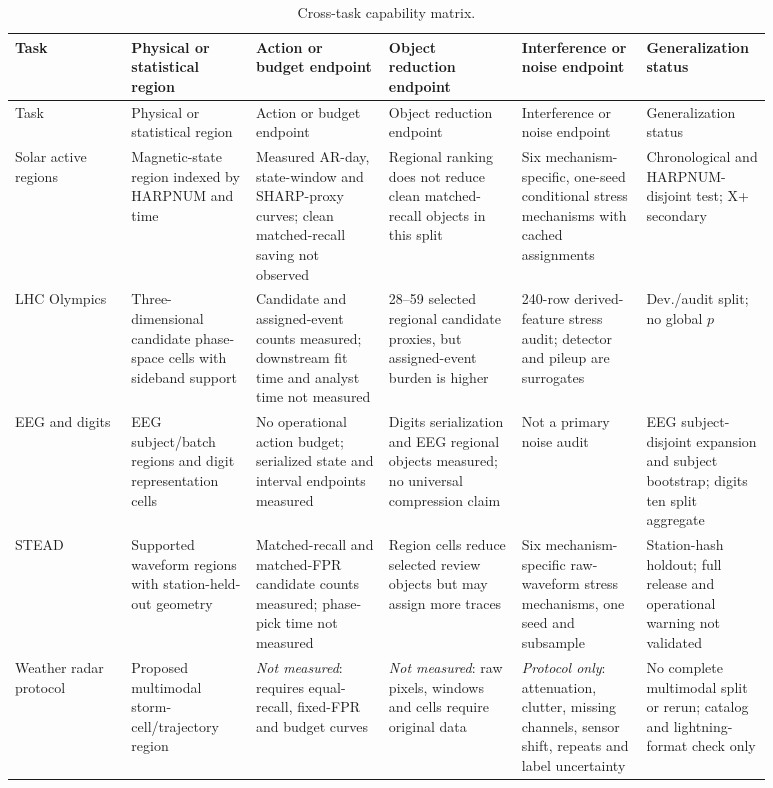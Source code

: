 \documentclass[11pt,a4paper]{article}
\numberwithin{equation}{section}
\theoremstyle{definition}\newtheorem{definition}[theorem]{Definition}
\theoremstyle{remark}\newtheorem{remark}[theorem]{Remark}
\begin{document}
{\scriptsize\setlength{\tabcolsep}{2pt}\begin{longtable}{L{0.14\linewidth}L{0.15\linewidth}L{0.16\linewidth}L{0.16\linewidth}L{0.15\linewidth}L{0.12\linewidth}}
\caption{Cross-task capability matrix.}\label{tab:capabilitymatrix}\\
\toprule
Task & Physical or statistical region & Action or budget endpoint & Object reduction endpoint & Interference or noise endpoint & Generalization status\\
\midrule
\endfirsthead
\toprule
Task & Physical or statistical region & Action or budget endpoint & Object reduction endpoint & Interference or noise endpoint & Generalization status\\
\midrule
\endhead
Solar active regions & Magnetic-state region indexed by HARPNUM and time & Measured AR-day, state-window and SHARP-proxy curves; clean matched-recall saving not observed & Regional ranking does not reduce clean matched-recall objects in this split & Six mechanism-specific, one-seed conditional stress mechanisms with cached assignments & Chronological and HARPNUM-disjoint test; X+ secondary\\
LHC Olympics & Three-dimensional candidate phase-space cells with sideband support & Candidate and assigned-event counts measured; downstream fit time and analyst time not measured & 28--59 selected regional candidate proxies, but assigned-event burden is higher & 240-row derived-feature stress audit; detector and pileup are surrogates & Dev./audit split; no global $p$\\
EEG and digits & EEG subject/batch regions and digit representation cells & No operational action budget; serialized state and interval endpoints measured & Digits serialization and EEG regional objects measured; no universal compression claim & Not a primary noise audit & EEG subject-disjoint expansion and subject bootstrap; digits ten split aggregate\\
STEAD & Supported waveform regions with station-held-out geometry & Matched-recall and matched-FPR candidate counts measured; phase-pick time not measured & Region cells reduce selected review objects but may assign more traces & Six mechanism-specific raw-waveform stress mechanisms, one seed and subsample & Station-hash holdout; full release and operational warning not validated\\
Weather radar protocol & Proposed multimodal storm-cell/trajectory region & \textit{Not measured}: requires equal-recall, fixed-FPR and budget curves & \textit{Not measured}: raw pixels, windows and cells require original data & \textit{Protocol only}: attenuation, clutter, missing channels, sensor shift, repeats and label uncertainty & No complete multimodal split or rerun; catalog and lightning-format check only\\
\bottomrule
\end{longtable}}
\end{document}
